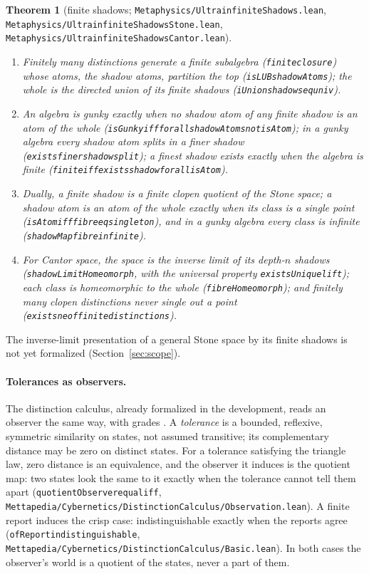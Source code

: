 \documentclass[]{article}
\newtheorem{theorem}{Theorem}
\theoremstyle{definition}
\theoremstyle{remark}
\newcommand{\codeus}{\textunderscore\allowbreak}
\newcommand{\code}[1]{\texttt{\let\_\codeus #1}}
\newcommand{\lpath}[1]{{\ttfamily\nolinkurl{#1}}}
\newcommand{\meta}[1]{\lpath{Metaphysics/#1.lean}}
\begin{document}
\begin{theorem}[finite shadows; \meta{UltrainfiniteShadows}, \meta{UltrainfiniteShadowsStone},
\meta{UltrainfiniteShadowsCantor}]
\label{thm:shadows}
\leavevmode
\begin{enumerate}
\item Finitely many distinctions generate a finite subalgebra (\code{finite\_closure}) whose atoms,
  the \emph{shadow atoms}, partition the top (\code{isLUB\_shadowAtoms}); the whole is the directed
  union of its finite shadows (\code{iUnion\_shadows\_eq\_univ}).
\item An algebra is gunky exactly when no shadow atom of any finite shadow is an atom of the whole
  (\code{isGunky\_iff\_forall\_shadowAtoms\_not\_isAtom}); in a gunky algebra every shadow atom splits
  in a finer shadow (\code{exists\_finer\_shadow\_split}); a finest shadow exists exactly when the
  algebra is finite (\code{finite\_iff\_exists\_shadow\_forall\_isAtom}).
\item Dually, a finite shadow is a finite clopen quotient of the Stone space; a shadow atom is an atom
  of the whole exactly when its class is a single point (\code{isAtom\_iff\_fibre\_eq\_singleton}), and
  in a gunky algebra every class is infinite (\code{shadowMap\_fibre\_infinite}).
\item For Cantor space, the space is the inverse limit of its depth-$n$ shadows
  (\code{shadowLimitHomeomorph}, with the universal property \code{existsUnique\_lift}); each class is
  homeomorphic to the whole (\code{fibreHomeomorph}); and finitely many clopen distinctions never
  single out a point (\code{exists\_ne\_of\_finite\_distinctions}).
\end{enumerate}
\end{theorem}

\noindent The inverse-limit presentation of a general Stone space by its finite shadows is not yet
formalized (Section~\ref{sec:scope}).

\paragraph{Tolerances as observers.} The distinction calculus, already formalized in the development,
reads an observer the same way, with grades \cite{GoertzelHyperseed}. A \emph{tolerance} is a bounded,
reflexive, symmetric similarity on states, not assumed transitive; its complementary distance may be
zero on distinct states. For a tolerance satisfying the triangle law, zero distance is an
equivalence, and the observer it induces is the quotient map: two states look the same to it exactly
when the tolerance cannot tell them apart (\code{quotientObserver\_equal\_iff},
\lpath{Mettapedia/Cybernetics/DistinctionCalculus/Observation.lean}). A finite report induces the
crisp case: indistinguishable exactly when the reports agree (\code{ofReport\_indistinguishable},
\lpath{Mettapedia/Cybernetics/DistinctionCalculus/Basic.lean}). In both cases the observer's world is a
quotient of the states, never a part of them.
\end{document}
